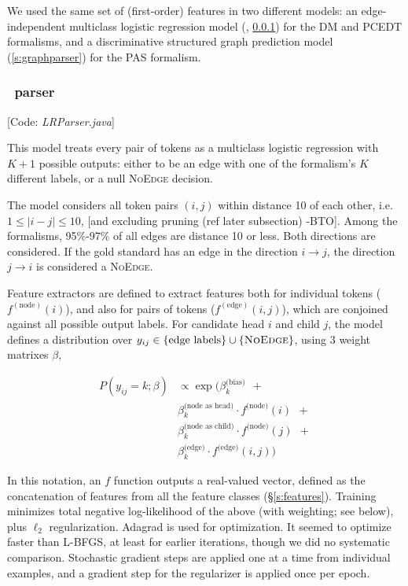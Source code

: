 \documentclass[11pt]{article}
\newcommand{\bocomment}[1]{\textcolor{Bittersweet}{[#1 -BTO]}}
\newcommand{\codenote}[1]{\textcolor{PineGreen}{[Code: \emph{#1}]}}
\begin{document}
We used the same set of (first-order) features
in two different models: an edge-independent multiclass %
logistic regression model (\logitedge, \ref{s:logitedge}) for the DM and PCEDT
formalisms, and a discriminative structured graph prediction model
(\ref{s:graphparser}) for the PAS formalism.


\subsubsection{\logitedge\ parser} \label{s:logitedge}


\codenote{LRParser.java}

\noindent
This model treats every pair of tokens as a multiclass logistic regression
with $K+1$ possible outputs:
either to be an edge with one of the formalism's $K$ different labels, or a null
\textsc{NoEdge} decision.  

The model considers all token pairs $(i,j)$ within distance 10 of each other, 
i.e.~$1\leq|i-j|\leq 10$, \bocomment{and excluding pruning (ref later subsection)}. Among the formalisms, 95\%-97\% of all edges are distance 10 or less.
Both directions are considered.  If the gold standard has an edge in the direction $i \rightarrow j$, the direction $j\rightarrow i$ is considered a \textsc{NoEdge}.

Feature extractors are defined to extract features both for individual tokens ($f^{(\text{node})}(i)$), and also for pairs of tokens ($f^{(\text{edge})}(i,j)$), which are conjoined against all possible output labels.
For candidate head $i$ and child $j$, the model defines a distribution over
$y_{ij} \in \{\text{edge labels}\} \cup \{\textsc{NoEdge}\}$, using $3$ weight matrixes $\beta$,

\begin{align*} 
  P(y_{ij}=k; \beta) & \propto 
  \exp \big( \beta^{\text{(bias)}}_k \ \ + \\
  &
  \beta^{\text{(node as head)}}_k \cdot f^{\text{(node)}}(i)
  \ \ + \\ 
  &
  \beta^{\text{(node as child)}}_k \cdot f^{\text{(node)}}(j)
  \ \ + \\
  &
  \beta^{\text{(edge)}}_k \cdot f^{\text{(edge)}}(i,j)
    \big)
\end{align*}

\noindent
In this notation, an $f$ function outputs a real-valued vector, defined as the concatenation of features from all the feature classes (\S\ref{s:features}).
Training minimizes total negative log-likelihood of the above (with weighting; see below),
plus $\ell_2$ regularization.  Adagrad \cite{duchi2011adaptive} is used for optimization.
It seemed to optimize faster than L-BFGS, at least for earlier iterations, though we did no systematic comparison. Stochastic gradient steps are applied one at a time from individual examples, and a gradient step for the regularizer is applied once per epoch.
\end{document}
